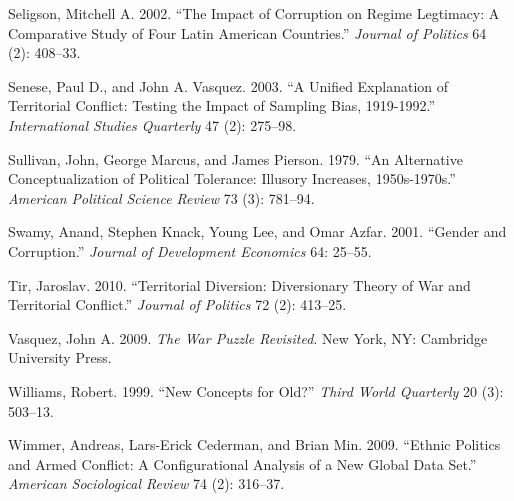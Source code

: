 \documentclass[11pt,]{article}
\begin{document}
\hypertarget{ref-seligson2002icrl}{}
Seligson, Mitchell A. 2002. ``The Impact of Corruption on Regime
Legtimacy: A Comparative Study of Four Latin American Countries.''
\emph{Journal of Politics} 64 (2): 408--33.

\hypertarget{ref-senesevasquez2003uet}{}
Senese, Paul D., and John A. Vasquez. 2003. ``A Unified Explanation of
Territorial Conflict: Testing the Impact of Sampling Bias, 1919-1992.''
\emph{International Studies Quarterly} 47 (2): 275--98.

\hypertarget{ref-sullivanetal1979acpt}{}
Sullivan, John, George Marcus, and James Pierson. 1979. ``An Alternative
Conceptualization of Political Tolerance: Illusory Increases,
1950s-1970s.'' \emph{American Political Science Review} 73 (3): 781--94.

\hypertarget{ref-swamyetal2001gc}{}
Swamy, Anand, Stephen Knack, Young Lee, and Omar Azfar. 2001. ``Gender
and Corruption.'' \emph{Journal of Development Economics} 64: 25--55.

\hypertarget{ref-tir2010td}{}
Tir, Jaroslav. 2010. ``Territorial Diversion: Diversionary Theory of War
and Territorial Conflict.'' \emph{Journal of Politics} 72 (2): 413--25.

\hypertarget{ref-vasquez2009twp}{}
Vasquez, John A. 2009. \emph{The War Puzzle Revisited}. New York, NY:
Cambridge University Press.

\hypertarget{ref-williams1999nco}{}
Williams, Robert. 1999. ``New Concepts for Old?'' \emph{Third World
Quarterly} 20 (3): 503--13.

\hypertarget{ref-wimmeretal2009epac}{}
Wimmer, Andreas, Lars-Erick Cederman, and Brian Min. 2009. ``Ethnic
Politics and Armed Conflict: A Configurational Analysis of a New Global
Data Set.'' \emph{American Sociological Review} 74 (2): 316--37.




\newpage
\singlespacing 
\end{document}
